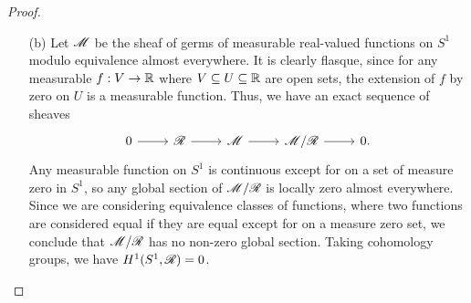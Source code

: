 \documentclass{article}
\begin{document}
\begin{enumerate} [label=\textbf{\arabic*.}, leftmargin=0em]
\begin{proof}
\begin{itemize} [leftmargin=0cm]
\item[(b)] Let $\mathscr{M}$ be the sheaf of germs of measurable real-valued functions on $S^1$ modulo equivalence almost everywhere. It is clearly flasque, since for any measurable $f : V \to \mathbb{R}$ where $V \subseteq U \subseteq \mathbb{R}$ are open sets, the extension of $f$ by zero on $U$ is a measurable function. Thus, we have an exact sequence of sheaves
\[ \begin{tikzcd}
    0 \arrow[r] & \fR \arrow[r] & \fM \arrow[r] & \fM/\fR \arrow[r] & 0.
    \end{tikzcd} \]
Any measurable function on $S^1$ is continuous except for on a set of measure zero in $S^1$, so any global section of $\mathscr{M} / \mathscr{R}$ is locally zero almost everywhere. Since we are considering equivalence classes of functions, where two functions are considered equal if they are equal except for on a measure zero set, we conclude that $\mathscr{M} / \mathscr{R}$ has no non-zero global section. Taking cohomology groups, we have $H^1(S^1, \mathscr{R}) = 0$.

\end{itemize}
\end{proof}

\end{enumerate}
\end{document}

